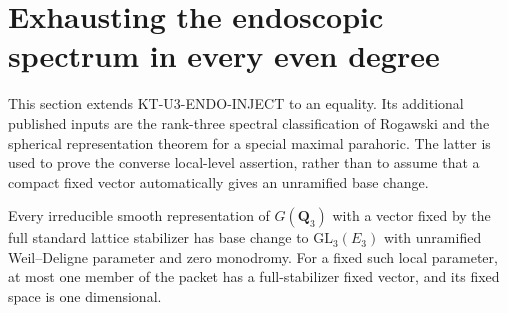 \section{Exhausting the endoscopic spectrum in every even degree}
\label{sec:kt-endoscopic-converse}

This section extends KT-U3-ENDO-INJECT to an equality. Its additional
published inputs are the rank-three spectral classification of Rogawski
and the spherical representation theorem for a special maximal parahoric.
The latter is used to prove the converse local-level assertion, rather
than to assume that a compact fixed vector automatically gives an
unramified base change.

\begin{lemma}
Every irreducible smooth representation of $G(\mathbf Q_3)$ with a
vector fixed by the full standard lattice stabilizer has base change to
$\mathrm{GL}_3(E_3)$ with unramified Weil--Deligne parameter and zero
monodromy. For a fixed such local parameter, at most one member of the
packet has a full-stabilizer fixed vector, and its fixed space is one
dimensional.
\end{lemma}

